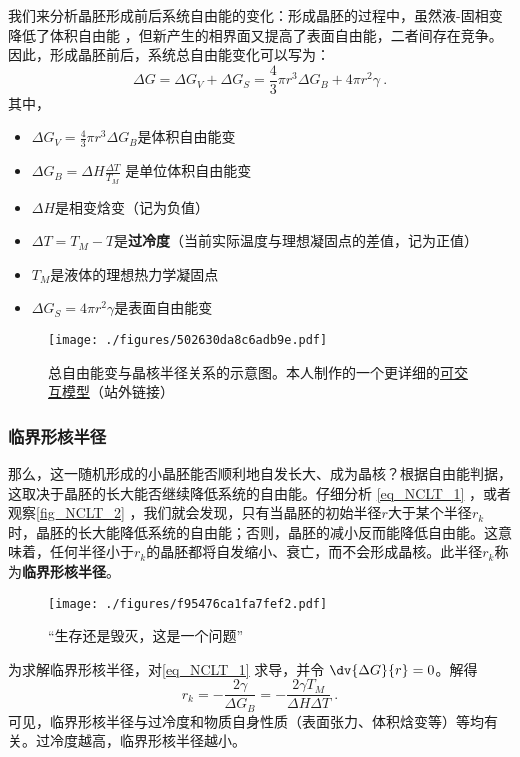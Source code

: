我们来分析晶胚形成前后系统自由能的变化：形成晶胚的过程中，虽然液-固相变降低了体积自由能 ，但新产生的相界面又提高了表面自由能，二者间存在竞争。因此，形成晶胚前后，系统总自由能变化可以写为： 
\begin{equation}\label{eq_NCLT_1}
\Delta G  = \Delta G_V +\Delta G_S = \frac{4}{3}\pi r^3 \Delta G_B + 4\pi r^2 \gamma ~.
\end{equation}
其中，
\begin{itemize}
\item $\Delta G_V = \frac{4}{3}\pi r^3 \Delta G_B$是体积自由能变
\item $\Delta G_B = \Delta H \frac{\Delta T}{T_M}$ 是单位体积自由能变
\item $\Delta H$是相变焓变（记为负值）
\item $\Delta T=T_M-T$是\textbf{过冷度}（当前实际温度与理想凝固点的差值，记为正值）
\item $T_M$是液体的理想热力学凝固点
\item $\Delta G_S = 4\pi r^2 \gamma$是表面自由能变
\end{itemize}

\begin{figure}[ht]
\centering
\texttt{[image: ./figures/502630da8c6adb9e.pdf]}
\caption{总自由能变与晶核半径关系的示意图。本人制作的一个更详细的\href{https://www.geogebra.org/m/prktxhhk}{可交互模型}（站外链接）} \label{fig_NCLT_2}
\end{figure}

\subsubsection{临界形核半径}
那么，这一随机形成的小晶胚能否顺利地自发长大、成为晶核？根据自由能判据，这取决于晶胚的长大能否继续降低系统的自由能。仔细分析 \autoref{eq_NCLT_1} ，或者观察\autoref{fig_NCLT_2} ，我们就会发现，只有当晶胚的初始半径$r$大于某个半径$r_k$时，晶胚的长大能降低系统的自由能；否则，晶胚的减小反而能降低自由能。这意味着，任何半径小于$r_k$的晶胚都将自发缩小、衰亡，而不会形成晶核。此半径$r_k$称为\textbf{临界形核半径}。
\begin{figure}[ht]
\centering
\texttt{[image: ./figures/f95476ca1fa7fef2.pdf]}
\caption{“生存还是毁灭，这是一个问题”} \label{fig_NCLT_3}
\end{figure}

为求解临界形核半径，对\autoref{eq_NCLT_1} 求导，并令 $\dv{\Delta G}{r} = 0$。解得
\begin{equation}
r_k=-\frac{2\gamma}{\Delta G_B}=-\frac{2\gamma T_M}{\Delta H \Delta T}~.
\end{equation}
可见，临界形核半径与过冷度和物质自身性质（表面张力、体积焓变等）等均有关。过冷度越高，临界形核半径越小。

